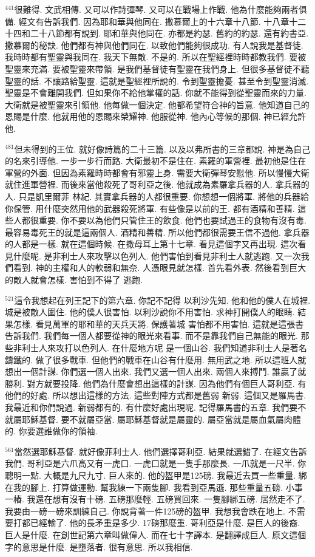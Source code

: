 \documentclass{book}
\begin{document}
$^{441}$很難得.
文武相傳.
又可以作詩彈琴.
又可以在戰場上作戰.
他為什麼能夠兩者俱備.
經文有告訴我們.
因為耶和華與他同在.
撒慕爾上的十六章十八節.
十八章十二十四和二十八節都有說到.
耶和華與他同在.
亦都是約瑟.
舊約的約瑟.
還有約書亞.
撒慕爾的秘訣.
他們都有神與他們同在.
以致他們能夠很成功.
有人說我是基督徒.
我時時都有聖靈與我同在.
我天下無敵.
不是的.
所以在聖經裡時時都教我們.
要被聖靈來充滿.
要被聖靈來帶領.
是我們基督徒有聖靈在我們身上.
但很多基督徒不聽聖靈的話.
不讓路給聖靈.
這就是聖經裡所說的.
令到聖靈擔憂.
甚至令到聖靈消滅.
聖靈是不會離開我們.
但如果你不給他掌權的話.
你就不能得到從聖靈而來的力量.
大衛就是被聖靈來引領他.
他每做一個決定.
他都希望符合神的旨意.
他知道自己的恩賜是什麼.
他就用他的恩賜來榮耀神.
他服從神.
他內心等候的那個.
神已經允許他.

$^{481}$但未得到的王位.
就好像詩篇的二十三篇.
以及以弗所書的三章都說.
神是為自己的名來引導他.
一步一步行而路.
大衛最初不是住在.
素羅的軍營裡.
最初他是住在軍營的外面.
但因為素羅時時都會有邪靈上身.
需要大衛彈琴安慰他.
所以慢慢大衛就住進軍營裡.
而後來當他殺死了哥利亞之後.
他就成為素羅拿兵器的人.
拿兵器的人.
只是凱里爾菲 林紀.
其實拿兵器的人都很重要.
你想想一個將軍.
將他的兵器給你保管.
用什麼突然用他的武器殺死將軍.
有些像是以前的王.
都有酒精和善精.
這些人都很重要.
你不要以為他們只管住王的飲食.
他們也要試過王的食物有沒有毒.
最容易毒死王的就是這兩個人.
酒精和善精.
所以他們都很需要王信不過他.
拿兵器的人都是一樣.
就在這個時候.
在撒母耳上第十七章.
看見這個字又再出現.
這次看見什麼呢.
是非利士人來攻擊以色列人.
他們害怕到看見非利士人就逃跑.
又一次我們看到.
神的主權和人的軟弱和無奈.
人憑眼見就怎樣.
首先看外表.
然後看到巨大的敵人就會怎樣.
害怕到不得了 逃跑.

$^{521}$這令我想起在列王記下的第六章.
你記不記得 以利沙先知.
他和他的僕人在城裡.
城是被敵人圍住.
他的僕人很害怕.
以利沙說你不用害怕.
求神打開僕人的眼睛.
結果怎樣.
看見萬軍的耶和華的天兵天將.
保護著城 害怕都不用害怕.
這就是這張書告訴我們.
我們每一個人都要從神的眼光來看事.
而不是靠我們自己無能的眼光.
那些非利士人來攻打以色列人.
在什麼地方呢 是一個山谷.
我們知道非利士人是著名鑄鐵的.
做了很多戰車.
但他們的戰車在山谷有什麼用.
無用武之地.
所以這班人就想出一個計謀.
你們選一個人出來.
我們又選一個人出來.
兩個人來搏鬥.
誰贏了就勝利.
對方就要投降.
他們為什麼會想出這樣的計謀.
因為他們有個巨人哥利亞.
有他們的好處.
所以想出這樣的方法.
這些對陣方式都是舊弱 新弱.
這個又是羅馬書.
我最近和你們說過.
新弱都有的.
有什麼好處出現呢.
記得羅馬書的五章.
我們要不就屬耶穌基督.
要不就屬亞當.
屬耶穌基督就是屬靈的.
屬亞當就是屬血氣屬肉體的.
你要選誰做你的領袖.

$^{561}$當然選耶穌基督.
就好像菲利士人.
他們選擇哥利亞.
結果就選錯了.
在經文告訴我們.
哥利亞是六爪高又有一虎口.
一虎口就是一隻手那麼長.
一爪就是一尺半.
你聰明一點.
大概是九尺九寸.
巨人來的.
他的盔甲是125磅.
我最近去買一些重量.
綁在我的腳上.
打算做運動.
幫我練一下兩隻腳.
我看到亞馬遜.
那些重量五磅.
小事一樁.
我還在想有沒有十磅.
五磅那麼輕.
五磅買回來.
一隻腳綁五磅.
居然走不了.
我要由一磅一磅來訓練自己.
你說背著一件125磅的盔甲.
我想我會跌在地上.
不需要打都已經輸了.
他的長矛重是多少.
17磅那麼重.
哥利亞是什麼.
是巨人的後裔.
巨人是什麼.
在創世記第六章叫做偉人.
而在七十字譯本.
是翻譯成巨人.
原文這個字的意思是什麼.
是墮落者.
很有意思.
所以我相信.
\end{document}
